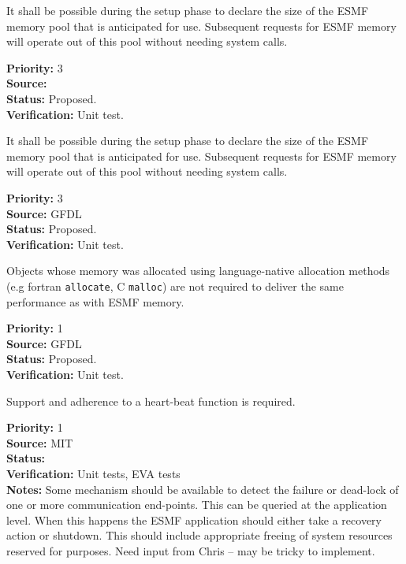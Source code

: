 It shall be possible during the setup phase to declare the size of the
ESMF memory pool that is anticipated for use. Subsequent requests for
ESMF memory will operate out of this pool without needing system
calls.
\begin{reqlist}
{\bf Priority:} 3 \\
{\bf Source:}  \\
{\bf Status:} Proposed. \\
{\bf Verification:} Unit test. \\ 
\end{reqlist}


It shall be possible during the setup phase to declare the size of the
ESMF memory pool that is anticipated for use. Subsequent requests for
ESMF memory will operate out of this pool without needing system
calls.
\begin{reqlist}
{\bf Priority:} 3 \\
{\bf Source:} GFDL \\
{\bf Status:} Proposed. \\
{\bf Verification:} Unit test. \\ 
\end{reqlist}

Objects whose memory was allocated using language-native allocation
methods (e.g fortran \texttt{allocate}, C \texttt{malloc}) are not
required to deliver the same performance as with ESMF memory.
\begin{reqlist}
{\bf Priority:} 1 \\
{\bf Source:} GFDL \\
{\bf Status:} Proposed. \\
{\bf Verification:} Unit test. \\ 
\end{reqlist}


Support and adherence to a heart-beat function is required.

\begin{reqlist}
  {\bf Priority:} 1 \\
  {\bf Source:}  MIT \\
  {\bf Status:}  \\
  {\bf Verification:} Unit tests, EVA tests \\
  {\bf Notes:} Some mechanism should be available to detect the
  failure or dead-lock of one or more communication end-points. This
  can be queried at the application level. When this happens the ESMF
  application should either take a recovery action or shutdown. 
  This should include appropriate freeing of system resources 
  reserved for {\bf \shortname} purposes.
  Need input from Chris -- may be tricky to implement. 
\end{reqlist}


